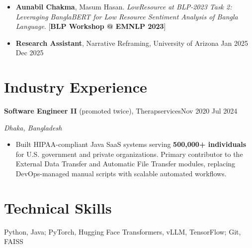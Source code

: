 \documentclass[11pt]{extarticle}
\newcommand{\entryheading}[2]{%
  {\normalsize #1}\hfill{\small #2}\par
}
\newcommand{\entrydetail}[1]{{\small #1}\par}
\begin{document}
\begin{itemize}
  \item {\normalsize \textbf{Aunabil Chakma}, Masum Hasan. \textit{LowResource at BLP-2023 Task 2: Leveraging BanglaBERT for Low Resource Sentiment Analysis of Bangla Language}. [\textbf{BLP Workshop @ EMNLP 2023}]}
  \item {\normalsize \textbf{Research Assistant}, Narrative Reframing, University of Arizona \hfill {\small Jan 2025 \textendash{} Dec 2025}}
\end{itemize}

\pagebreak

\section*{Industry Experience}
\entryheading{\textbf{Software Engineer II} (promoted twice), Therapservices}{Nov 2020 \textendash{} Jul 2024}
\entrydetail{\textit{Dhaka, Bangladesh}}
\begin{itemize}
  \item {\small Built HIPAA-compliant Java SaaS systems serving \textbf{500,000+ individuals} for U.S. government and private organizations. Primary contributor to the External Data Transfer and Automatic File Transfer modules, replacing DevOps-managed manual scripts with scalable automated workflows.}
\end{itemize}

\section*{Technical Skills}
{\small Python, Java; PyTorch, Hugging Face Transformers, vLLM, TensorFlow; Git, FAISS}
\end{document}
